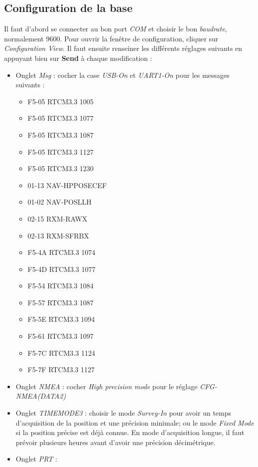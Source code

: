 \documentclass[12pt]{report}
\begin{document}
\subsection{Configuration de la base}
Il faut d'abord se connecter au bon port \textit{COM} et choisir le bon \textit{baudrate}, normalement 9600.
Pour ouvrir la fenêtre de configuration, cliquer sur \textit{Configuration View}. Il faut ensuite renseiner les différents réglages suivants en appuyant bien sur \textbf{Send} à chaque modification : 
\begin{itemize}
    \item Onglet \textit{Msg} : cocher la case \textit{USB-On} et \textit{UART1-On} pour les messages suivants : 
    \begin{itemize}
        \item F5-05 RTCM3.3 1005
        \item F5-05 RTCM3.3 1077
        \item F5-05 RTCM3.3 1087
        \item F5-05 RTCM3.3 1127
        \item F5-05 RTCM3.3 1230
        \item 01-13 NAV-HPPOSECEF
        \item 01-02 NAV-POSLLH
        \item 02-15 RXM-RAWX
        \item 02-13 RXM-SFRBX
        \item F5-4A RTCM3.3 1074
        \item F5-4D RTCM3.3 1077
        \item F5-54 RTCM3.3 1084
        \item F5-57 RTCM3.3 1087
        \item F5-5E RTCM3.3 1094
        \item F5-61 RTCM3.3 1097
        \item F5-7C RTCM3.3 1124
        \item F5-7F RTCM3.3 1127
    \end{itemize}
    \item Onglet \textit{NMEA} : cocher \textit{High precision mode} pour le réglage \textit{CFG-NMEA(DATA2)}
    \item Onglet \textit{TIMEMODE3} : choisir le mode \textit{Survey-In} pour avoir un temps d'acquisition de la position et une précision minimale; ou le mode \textit{Fixed Mode} si la position précise est déjà connue. En mode d'acquisition longue, il faut prévoir plusieurs heures avant d'avoir une précision décimétrique.
    \item Onglet \textit{PRT} : 

\end{itemize}
\end{document}
